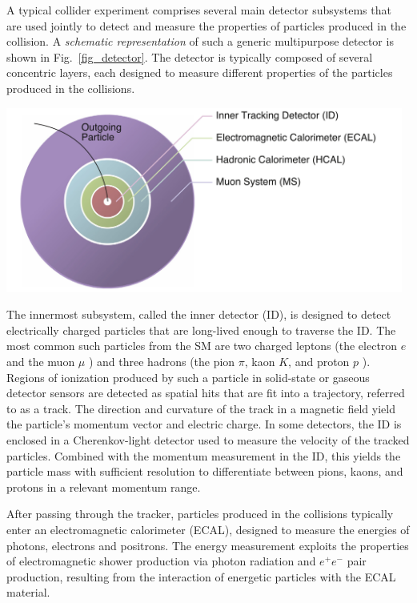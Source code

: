 A typical collider experiment comprises several main detector subsystems that are used jointly to detect and measure the properties of particles produced in the collision. A \textit{schematic representation} of such a generic multipurpose detector is shown in Fig.~\ref{fig_detector}. The detector is typically composed of several concentric layers, each designed to measure different properties of the particles produced in the collisions. 

\begin{center}
	\includegraphics[width=0.98\textwidth]{Images/detector.png}
	\label{fig_detector}
\end{center}

The innermost subsystem, called the inner detector (ID), is designed to detect electrically charged particles that are long-lived enough to traverse the ID. The most common such particles from the SM are two charged leptons (the electron $e$ and the muon $\mu$ ) and three hadrons (the pion $\pi$, kaon $K$, and proton $p$ ). Regions of ionization produced by such a particle in solid-state or gaseous detector sensors are detected as spatial hits that are fit into a trajectory, referred to as a track. The direction and curvature of the track in a magnetic field yield the particle's momentum vector and electric charge. In some detectors, the ID is enclosed in a Cherenkov-light detector used to measure the velocity of the tracked particles. Combined with the momentum measurement in the ID, this yields the particle mass with sufficient resolution to differentiate between pions, kaons, and protons in a relevant momentum range.

After passing through the tracker, particles produced in the collisions typically enter an electromagnetic calorimeter (ECAL), designed to measure the energies of photons, electrons and positrons. The energy measurement exploits the properties of electromagnetic shower production via photon radiation and $e^{+} e^{-}$ pair production, resulting from the interaction of energetic particles with the ECAL material.

